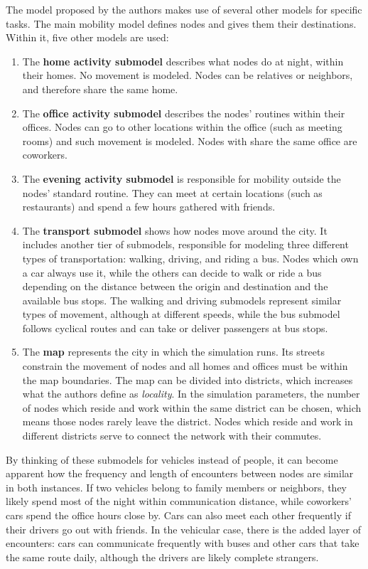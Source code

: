 The model proposed by the authors makes use of several other models for specific tasks.
The main mobility model defines nodes and gives them their destinations.
Within it, five other models are used:
\begin{enumerate}
\item 
The \textbf{home activity submodel} describes what nodes do at night, within their homes.
No movement is modeled.
Nodes can be relatives or neighbors, and therefore share the same home.
\item 
The \textbf{office activity submodel} describes the nodes' routines within their offices.
Nodes can go to other locations within the office (such as meeting rooms) and such movement is modeled.
Nodes with share the same office are coworkers.
\item 
The \textbf{evening activity submodel} is responsible for mobility outside the nodes' standard routine. 
They can meet at certain locations (such as restaurants) and spend a few hours gathered with friends.
\item
The \textbf{transport submodel} shows how nodes move around the city.
It includes another tier of submodels, responsible for modeling three different types of transportation: walking, driving, and riding a bus.
Nodes which own a car always use it, while the others can decide to walk or ride a bus depending on the distance between the origin and destination and the available bus stops.
The walking and driving submodels represent similar types of movement, although at different speeds, while the bus submodel follows cyclical routes and can take or deliver passengers at bus stops.
\item
The \textbf{map} represents the city in which the simulation runs.
Its streets constrain the movement of nodes and all homes and offices must be within the map boundaries.
The map can be divided into districts, which increases what the authors define as \textit{locality}.
In the simulation parameters, the number of nodes which reside and work within the same district can be chosen, which means those nodes rarely leave the district.
Nodes which reside and work in different districts serve to connect the network with their commutes.
\end{enumerate}

By thinking of these submodels for vehicles instead of people, it can become apparent how the frequency and length of encounters between nodes are similar in both instances.
If two vehicles belong to family members or neighbors, they likely spend most of the night within communication distance, while coworkers' cars spend the office hours close by.
Cars can also meet each other frequently if their drivers go out with friends.
In the vehicular case, there is the added layer of encounters: cars can communicate frequently with buses and other cars that take the same route daily, although the drivers are likely complete strangers.

